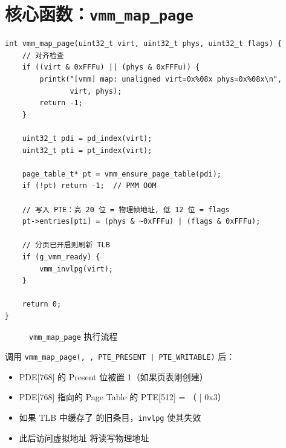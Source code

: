 \section{核心函数：\texttt{vmm\_map\_page}}

\begin{lstlisting}[style=cstyle]
int vmm_map_page(uint32_t virt, uint32_t phys, uint32_t flags) {
    // 对齐检查
    if ((virt & 0xFFFu) || (phys & 0xFFFu)) {
        printk("[vmm] map: unaligned virt=0x%08x phys=0x%08x\n",
               virt, phys);
        return -1;
    }

    uint32_t pdi = pd_index(virt);
    uint32_t pti = pt_index(virt);

    page_table_t* pt = vmm_ensure_page_table(pdi);
    if (!pt) return -1;  // PMM OOM

    // 写入 PTE：高 20 位 = 物理帧地址, 低 12 位 = flags
    pt->entries[pti] = (phys & ~0xFFFu) | (flags & 0xFFFu);

    // 分页已开启则刷新 TLB
    if (g_vmm_ready) {
        vmm_invlpg(virt);
    }

    return 0;
}
\end{lstlisting}

\begin{figure}[H]
  \centering
  
  \caption{\texttt{vmm\_map\_page} 执行流程}
  \label{fig:map-page-flow}
\end{figure}

\begin{cpustate}
调用 \texttt{vmm\_map\_page(, , PTE\_PRESENT | PTE\_WRITABLE)} 后：

\begin{itemize}
  \item PDE[768] 的 Present 位被置 1（如果页表刚创建）
  \item PDE[768] 指向的 Page Table 的 PTE[512] = （ | 0x3）
  \item 如果 TLB 中缓存了  的旧条目，\texttt{invlpg} 使其失效
  \item 此后访问虚拟地址  将读写物理地址 
\end{itemize}
\end{cpustate}


